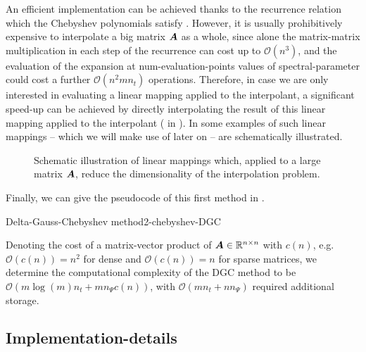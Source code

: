 An efficient implementation can be achieved thanks to the recurrence relation
which the Chebyshev polynomials satisfy .
However, it is usually prohibitively expensive to interpolate a big matrix
$\boldsymbol{A}$ as a whole, since alone the matrix-matrix multiplication in each step
of the recurrence can cost up to $\mathcal{O}(n^3)$, and the evaluation
of the expansion at \gls{num-evaluation-points} values of \gls{spectral-parameter} could
cost a further $\mathcal{O}(n^2 m n_t)$ operations. Therefore, in case we are only interested
in evaluating a linear mapping applied to the interpolant, a significant speed-up can be
achieved by directly interpolating the result of this linear mapping applied to
the interpolant ( in ).
In  some examples
of such linear mappings -- which we will make use of later on -- are schematically
illustrated.\\
\begin{figure}[ht]
    \centering
    
    \caption{Schematic illustration of linear mappings which, applied to a large
        matrix $\boldsymbol{A}$, reduce the dimensionality of the interpolation problem.}
    \label{fig:2-chebyshev-sketched-interpolation}
\end{figure}

Finally, we can give the pseudocode
of this first method in .
\begin{algo}{Delta-Gauss-Chebyshev method}{2-chebyshev-DGC}
    
\end{algo}

Denoting the cost of a matrix-vector product of $\boldsymbol{A} \in \mathbb{R}^{n \times n}$
with $c(n)$, e.g. $\mathcal{O}(c(n)) = n^2$ for dense and
$\mathcal{O}(c(n)) = n$ for sparse matrices, we determine the computational
complexity of the \gls{DGC} method to be $\mathcal{O}(m \log(m) n_t + m n_{\Psi} c(n))$,
with $\mathcal{O}(m n_t + n n_{\Psi})$ required additional storage.


\subsection{Implementation-details}
\label{subsec:2-chebyshev-implementation-details}


